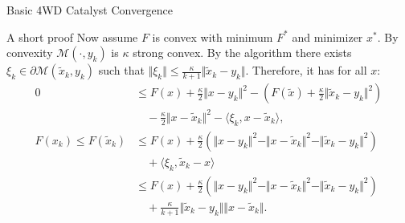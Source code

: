 \documentclass[11pt]{beamer}
\begin{document}
\begin{frame}{Basic 4WD Catalyst Convergence}
\begin{block}{\tiny A short proof}
                {
                Now assume $F$ is convex with minimum $F^*$ and minimizer $x^*$. 
                By convexity $\mathcal M(\cdot, y_{k})$ is $\kappa$ strong convex. 
                By the algorithm there exists $\xi_k \in \partial \mathcal M(\tilde x_k, y_k)$ such that $\Vert \xi_k\Vert \le \frac{\kappa}{k + 1}\Vert \tilde x_k - y_k\Vert$. 
                Therefore, it has for all $x$: 
                \begin{align*}
                    0 &\le
                    F(x) + \frac{\kappa}{2}\Vert x - y_k\Vert^2 
                    - \left(
                        F(\tilde x) 
                        + \frac{\kappa}{2}\Vert \tilde x_k - y_k\Vert^2
                    \right)
                    \\
                    & \quad 
                        - \frac{\kappa}{2}\Vert x - \tilde x_k\Vert^2 
                        - \langle \xi_k, x - \tilde x_k\rangle, 
                    \\
                    F(x_k)
                    \le F(\tilde x_k) 
                    &\le 
                    F(x) + \frac{\kappa}{2}\left(
                        \Vert x - y_k\Vert^2 - \Vert x - \tilde x_k\Vert^2 - \Vert \tilde x_k - y_k\Vert^2
                    \right)
                    \\ &\quad 
                        + \langle  \xi_k, \tilde x_k - x \rangle 
                    \\
                    &\le 
                    F(x) + \frac{\kappa}{2}\left(
                        \Vert x - y_k\Vert^2 - \Vert x - \tilde x_k\Vert^2 - \Vert \tilde x_k - y_k\Vert^2
                    \right)
                    \\ &\quad 
                        + \frac{\kappa}{k + 1}\Vert \tilde x_k - y_k\Vert\Vert x - \tilde x_k\Vert. 
                \end{align*}
                }
                

\end{block}
\end{frame}
\end{document}
